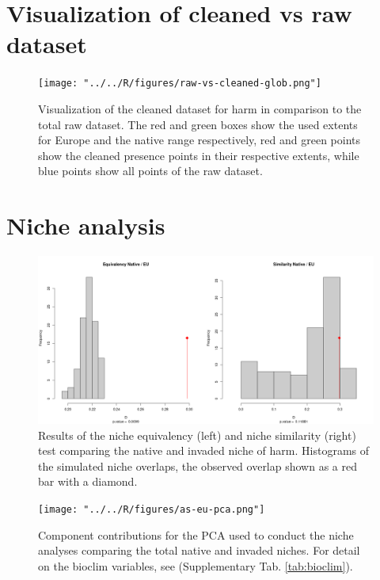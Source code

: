 \newpage
\appendix

\section{Visualization of cleaned vs raw dataset}

\begin{figure}[!h]
    \centering
    \texttt{[image: "../../R/figures/raw-vs-cleaned-glob.png"]}
    \caption{\label{fig:raw_vs_cleaned_glob} Visualization of the cleaned dataset for \gls{harm} in comparison to the total raw dataset. The red and green boxes show the used extents for Europe and the native range respectively, red and green points show the cleaned presence points in their respective extents, while blue points show all points of the raw dataset.}
\end{figure}



\section{Niche analysis}

\begin{figure}[!h]
    \centering
    \includegraphics[width = 0.9\linewidth]{"../../R/figures/as-eu-tot-eq-sim.png"}
    \caption{\label{fig:as_eu_eq_sim} Results of the niche equivalency (left) and niche similarity (right) test comparing the native and invaded niche of \gls{harm}. Histograms of the simulated niche overlaps, the observed overlap shown as a red bar with a diamond.}
\end{figure}

\begin{figure}[!h]
    \centering
    \texttt{[image: "../../R/figures/as-eu-pca.png"]}
    \caption{\label{fig:as_eu_niche_pca} Component contributions for the PCA used to conduct the niche analyses comparing the total native and invaded niches. For detail on the bioclim variables, see (Supplementary Tab. \ref{tab:bioclim}).}
\end{figure}

